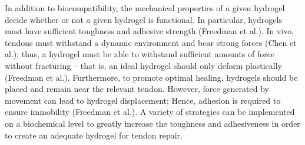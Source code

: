 In addition to biocompatibility, the mechanical properties of a given hydrogel decide whether or not a given hydrogel is functional. In particular, hydrogels must have sufficient toughness and adhesive strength (Freedman et al.). In vivo, tendons must withstand a dynamic environment and bear strong forces (Chen et al.); thus, a hydrogel must be able to withstand sufficient amounts of force without fracturing – that is, an ideal hydrogel should only deform plastically (Freedman et al.). Furthermore, to promote optimal healing, hydrogels should be placed and remain near the relevant tendon. However, force generated by movement can lead to hydrogel displacement; Hence, adhesion is required to ensure immobility (Freedman et al.). A variety of strategies can be implemented on a biochemical level to greatly increase the toughness and adhesiveness in order to create an adequate hydrogel for tendon repair.